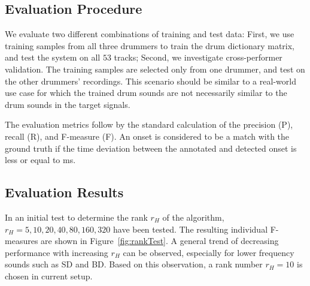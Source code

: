 \documentclass{article}
\newcommand{\figref}[1]{\mbox{Figure~\ref{#1}}}
\begin{document}
\subsection{Evaluation Procedure}\label{subsec:evaluation procedure}
We evaluate two different combinations of training and test data: First, we use training samples from all three drummers to train the drum dictionary matrix, and test the system on all $53$ tracks; Second, we investigate cross-performer validation. %
The training samples are selected only from one drummer, and test on the other drummers' recordings. This scenario should be similar to a real-world use case for which the trained drum sounds are not necessarily similar to the drum sounds in the target signals.


The evaluation metrics follow by the standard calculation of the precision (P), recall (R), and F-measure (F). %
An onset is considered to be a match with the ground truth if the time deviation between the annotated and detected onset is less or equal to \unit[50]{ms}.  

\subsection{Evaluation Results}\label{subsec:evaluation results}
In an initial test to determine the rank $r_H$ of the algorithm, $r_H = {5, 10, 20, 40, 80, 160, 320}$ have been tested. The resulting individual F-measures are shown in \figref{fig:rankTest}. A general trend of decreasing performance with increasing $r_H$ can be observed, especially for lower frequency sounds such as SD and BD. Based on this observation, a rank number $r_H = 10$ is chosen in current setup.

\end{document}
